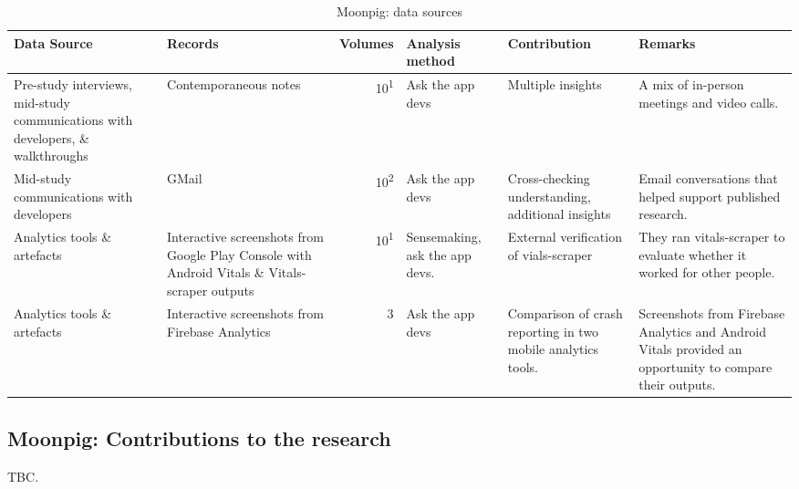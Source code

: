 \begin{table*}
    \centering
    \footnotesize
    \tabcolsep=0.12cm
    \begin{tabular}{p{2.6cm}p{2.9cm}r>{\raggedright}p{2.1cm}>{\raggedright\arraybackslash}p{2.5cm}>{\raggedright\arraybackslash}p{3cm}}
        Data Source & Records & Volumes & Analysis method & Contribution & Remarks \\
        \toprule
         Pre-study interviews, mid-study communications with developers, \& walkthroughs & Contemporaneous notes & 10\textsuperscript{1} & Ask the app devs & Multiple insights & A mix of in-person meetings and video calls.  \\
         Mid-study communications with developers & GMail & 10\textsuperscript{2} & Ask the app devs & Cross-checking understanding, additional insights & Email conversations that helped support published research. \\
         Analytics tools \& artefacts &Interactive screenshots from Google Play Console with Android Vitals \& Vitals-scraper outputs &10\textsuperscript{1} & Sensemaking, ask the app devs. & External verification of vials-scraper & They ran vitals-scraper to evaluate whether it worked for other people. \\
         Analytics tools \& artefacts & Interactive screenshots from Firebase Analytics & 3 & Ask the app devs & Comparison of crash reporting in two mobile analytics tools. & Screenshots from Firebase Analytics and Android Vitals provided an opportunity to compare their outputs. \\
         \bottomrule
    \end{tabular}
    \caption{Moonpig: data sources}
    \label{tab:moonpig-data-sources}
\end{table*}


\subsection{Moonpig: Contributions to the research}
TBC. 

